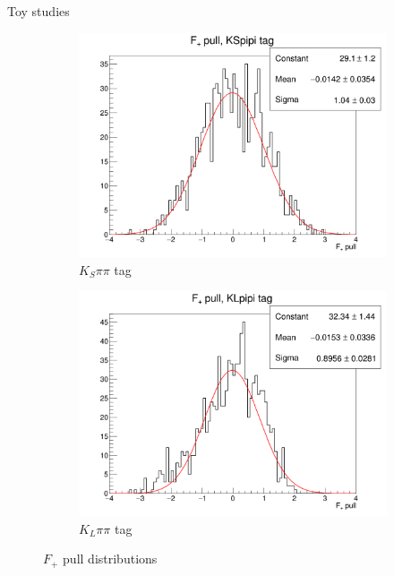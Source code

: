 \documentclass{beamer}
\begin{document}
\begin{frame}{Toy studies}
\begin{figure}
\begin{subfigure}{0.33\textwidth}
      \includegraphics[width=\textwidth]{Plots/FPlus_toy_KSpipi.png}
      \caption{$K_S\pi\pi$ tag}
    \end{subfigure}%
    \begin{subfigure}{0.33\textwidth}
      \centering
      \includegraphics[width=\textwidth]{Plots/FPlus_toy_KLpipi.png}
      \caption{$K_L\pi\pi$ tag}
    \end{subfigure}
    \caption{$F_+$ pull distributions}
  \end{figure}
\end{frame}
\end{document}
